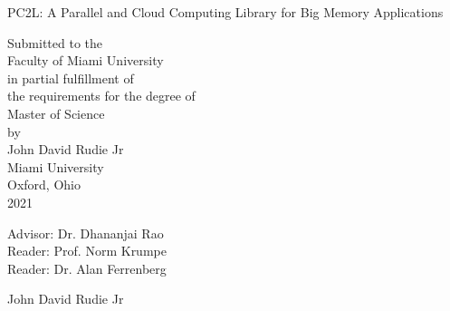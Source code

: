 \documentclass[12pt, oneside]{book2}
\begin{document}
\begin{titlepage}
\begin{center}
PC2L: A Parallel and Cloud Computing Library for Big Memory Applications

\vspace{1.5cm}


\vspace{0.5cm}

Submitted to the \\
Faculty of Miami University \\
in partial fulfillment of \\
the requirements for the degree of \\
Master of Science \\
by \\
John David Rudie Jr \\
Miami University \\
Oxford, Ohio \\
2021

\vspace{1.5cm}

Advisor: Dr. Dhananjai Rao\\
Reader: Prof. Norm Krumpe\\
Reader: Dr. Alan Ferrenberg\\


\vspace{1.5cm}

 John David Rudie Jr

\end{center}

\end{titlepage}




\singlespacing
\setcounter{page}{3}
\tableofcontents
\setcounter{tocdepth}{2}
\cleardoublepage
{}
\listoftables
\cleardoublepage
{}
\listoffigures

\newpage


\mainmatter








\backmatter



\end{document}
